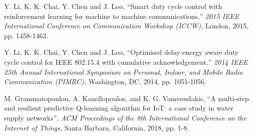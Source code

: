 \documentclass[journal]{IEEEtran}
\begin{document}
\begin{thebibliography}{1}
Y. Li, K. K. Chai, Y. Chen and J. Loo, ``Smart duty cycle control with reinforcement learning for machine to machine communications,'' \emph{2015 IEEE International Conference on Communication Workshop (ICCW),} London, 2015, pp. 1458-1463.

Y. Li, K. K. Chai, Y. Chen and J. Loo, ``Optimised delay-energy aware duty cycle control for IEEE 802.15.4 with cumulative acknowledgement,'' \emph{2014 IEEE 25th Annual International Symposium on Personal, Indoor, and Mobile Radio Communication (PIMRC),} Washington, DC, 2014, pp. 1051-1056.

M. Grammatopoulou, A. Kanellopoulos, and K. G. Vamvoudakis, ``A multi-step and resilient predictive Q-learning algorithm for IoT: a case study in water supply networks'', \emph{ACM Proceedings of the 8th International Conference on the Internet of Things,} Santa Barbara, California, 2018, pp. 1-8.

\end{thebibliography}





\end{document}
